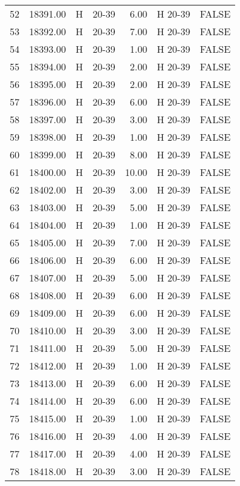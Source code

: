 \begin{table}[ht]
\begin{tabular}{rrllrll}
  52 & 18391.00 & H & 20-39 & 6.00 & H 20-39 & FALSE \\ 
  53 & 18392.00 & H & 20-39 & 7.00 & H 20-39 & FALSE \\ 
  54 & 18393.00 & H & 20-39 & 1.00 & H 20-39 & FALSE \\ 
  55 & 18394.00 & H & 20-39 & 2.00 & H 20-39 & FALSE \\ 
  56 & 18395.00 & H & 20-39 & 2.00 & H 20-39 & FALSE \\ 
  57 & 18396.00 & H & 20-39 & 6.00 & H 20-39 & FALSE \\ 
  58 & 18397.00 & H & 20-39 & 3.00 & H 20-39 & FALSE \\ 
  59 & 18398.00 & H & 20-39 & 1.00 & H 20-39 & FALSE \\ 
  60 & 18399.00 & H & 20-39 & 8.00 & H 20-39 & FALSE \\ 
  61 & 18400.00 & H & 20-39 & 10.00 & H 20-39 & FALSE \\ 
  62 & 18402.00 & H & 20-39 & 3.00 & H 20-39 & FALSE \\ 
  63 & 18403.00 & H & 20-39 & 5.00 & H 20-39 & FALSE \\ 
  64 & 18404.00 & H & 20-39 & 1.00 & H 20-39 & FALSE \\ 
  65 & 18405.00 & H & 20-39 & 7.00 & H 20-39 & FALSE \\ 
  66 & 18406.00 & H & 20-39 & 6.00 & H 20-39 & FALSE \\ 
  67 & 18407.00 & H & 20-39 & 5.00 & H 20-39 & FALSE \\ 
  68 & 18408.00 & H & 20-39 & 6.00 & H 20-39 & FALSE \\ 
  69 & 18409.00 & H & 20-39 & 6.00 & H 20-39 & FALSE \\ 
  70 & 18410.00 & H & 20-39 & 3.00 & H 20-39 & FALSE \\ 
  71 & 18411.00 & H & 20-39 & 5.00 & H 20-39 & FALSE \\ 
  72 & 18412.00 & H & 20-39 & 1.00 & H 20-39 & FALSE \\ 
  73 & 18413.00 & H & 20-39 & 6.00 & H 20-39 & FALSE \\ 
  74 & 18414.00 & H & 20-39 & 6.00 & H 20-39 & FALSE \\ 
  75 & 18415.00 & H & 20-39 & 1.00 & H 20-39 & FALSE \\ 
  76 & 18416.00 & H & 20-39 & 4.00 & H 20-39 & FALSE \\ 
  77 & 18417.00 & H & 20-39 & 4.00 & H 20-39 & FALSE \\ 
  78 & 18418.00 & H & 20-39 & 3.00 & H 20-39 & FALSE \\ 

\end{tabular}
\end{table}
